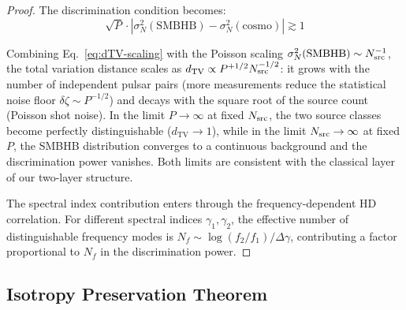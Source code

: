 \documentclass[11pt,a4paper]{article}
\begin{document}
\begin{proof}
The discrimination condition becomes:
\begin{equation}
\sqrt{P} \cdot \left| \sigma_N^2(\mathrm{SMBHB}) - \sigma_N^2(\mathrm{cosmo}) \right| \gtrsim 1
\end{equation}

Combining Eq.~\eqref{eq:dTV-scaling} with the Poisson scaling $\sigma_N^2(\mathrm{SMBHB}) \sim N_{\rm src}^{-1}$, the total variation distance scales as $d_{\mathrm{TV}} \propto P^{+1/2} N_{\rm src}^{-1/2}$: it grows with the number of independent pulsar pairs (more measurements reduce the statistical noise floor $\delta\zeta \sim P^{-1/2}$) and decays with the square root of the source count (Poisson shot noise). In the limit $P \to \infty$ at fixed $N_{\rm src}$, the two source classes become perfectly distinguishable ($d_{\mathrm{TV}} \to 1$), while in the limit $N_{\rm src} \to \infty$ at fixed $P$, the SMBHB distribution converges to a continuous background and the discrimination power vanishes. Both limits are consistent with the classical layer of our two-layer structure.

The spectral index contribution enters through the frequency-dependent HD correlation. For different spectral indices $\gamma_1, \gamma_2$, the effective number of distinguishable frequency modes is $N_f \sim \log(f_2/f_1)/\Delta\gamma$, contributing a factor proportional to $N_f$ in the discrimination power.
\end{proof}

\subsection{Isotropy Preservation Theorem}\label{sec:isotropy}
\end{document}
